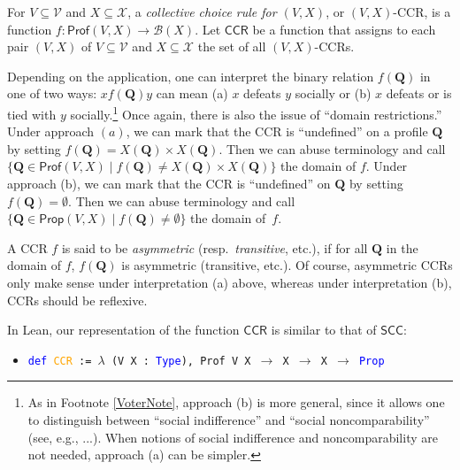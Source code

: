 \documentclass[runningheads]{llncs}
\begin{document}
\begin{definition}\textnormal{For $V\subseteq\mathcal{V}$ and $X\subseteq\mathcal{X}$, a \textit{collective choice rule for $(V,X)$}, or $(V,X)$-CCR, is a function  $f: \mathsf{Prof}(V,X)\to \mathcal{B}(X)$. Let $\mathsf{CCR}$ be a function that assigns to each pair $(V,X)$ of $V\subseteq\mathcal{V}$ and $X\subseteq\mathcal{X}$ the set of all $(V,X)$-CCRs.}\end{definition}

\noindent Depending on the application, one can interpret the binary relation $f(\mathbf{Q})$ in one of two ways: $xf(\mathbf{Q})y$ can mean (a) $x$ defeats $y$ socially or (b) $x$ defeats or is tied with $y$ socially.\footnote{As in Footnote \ref{VoterNote}, approach (b) is more general, since it allows one to distinguish between ``social indifference'' and ``social noncomparability'' (see, e.g., ...). When notions of social indifference and noncomparability are not needed, approach (a) can be simpler.} Once again, there is also the issue of ``domain restrictions.'' Under approach $(a)$, we can mark that the CCR is ``undefined'' on a profile $\mathbf{Q}$ by setting $f(\mathbf{Q})= X(\mathbf{Q})\times X(\mathbf{Q})$. Then we can abuse terminology and call $\{\mathbf{Q}\in\mathsf{Prof}(V,X)\mid f(\mathbf{Q})\neq X(\mathbf{Q})\times X(\mathbf{Q}) \}$ the domain of $f$. Under approach (b), we can mark that the CCR is ``undefined'' on $\mathbf{Q}$ by setting $f(\mathbf{Q})=\emptyset$. Then we can abuse terminology and call $\{\mathbf{Q}\in\mathsf{Prop}(V,X)\mid f(\mathbf{Q})\neq \emptyset\}$ the domain of~$f$. 

A CCR $f$ is said to be \textit{asymmetric} (resp.~\textit{transitive}, etc.), if for all $\mathbf{Q}$ in the domain of $f$, $f(\mathbf{Q})$ is asymmetric (transitive, etc.). Of course, asymmetric CCRs only make sense under interpretation (a) above, whereas under interpretation (b), CCRs should be reflexive.

In Lean, our representation of the function $\mathsf{CCR}$ is similar to that of $\mathsf{SCC}$:
\begin{itemize}
\item[] \texttt{\textcolor{blue}{def} \textcolor{orange}{CCR} := $\lambda$ (V X : \textcolor{blue}{Type}), Prof V X $\to$ X $\to$ X $\to$ \textcolor{blue}{Prop}}
\end{itemize}
\end{document}
